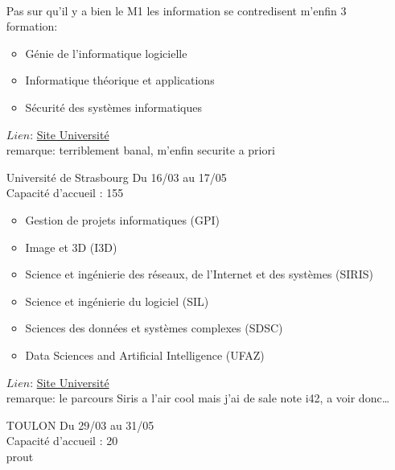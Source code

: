 \documentclass[a4paper,11pt]{article}
\begin{document}
\begin{enumerate}
                    \\Pas sur qu'il y a bien le M1 les information se contredisent m'enfin 3 formation:
                    \begin{itemize}
                        \item Génie de l'informatique logicielle
                        \item Informatique théorique et applications 
                        \item Sécurité des systèmes informatiques
                    \end{itemize}
                    $Lien$: \href{http://sciences-techniques.univ-rouen.fr/offre-de-formation-les-masters-332182.kjsp?RH=1378317039388&RF=1378324428882}{Site Université}
                    \\ remarque: terriblement banal, m'enfin securite a priori
\\
        \item [\color{LightOrangeHaf}Université de Strasbourg] Du 16/03 au 17/05
                    \\Capacité d'accueil : 155
                    \begin{itemize}
                        \item  Gestion de projets informatiques (GPI)
                        \item Image et 3D (I3D)
                        \item Science et ingénierie des réseaux, de l'Internet et des systèmes (SIRIS)
                        \item Science et ingénierie du logiciel (SIL)
                        \item Sciences des données et systèmes complexes (SDSC)
                        \item Data Sciences and Artificial Intelligence (UFAZ)
                    \end{itemize}
                    $Lien$: \href{https://www.unistra.fr/index.php?id=27887&tx_unistrarof_pi1%5Brof-program%5D=ME192&cHash=c1efbb9365a532ad89a9ceaed0405dc4#data-rof-tab-presentation}{Site Université}
                    \\ remarque: le parcours Siris a l'air cool mais j'ai de sale note i42, a voir donc\ldots
\\
        \item [\color{LightOrangeHaf}TOULON] Du 29/03 au 31/05
                    \\Capacité d'accueil : 20
                    \\prout

\end{enumerate}
\end{document}
